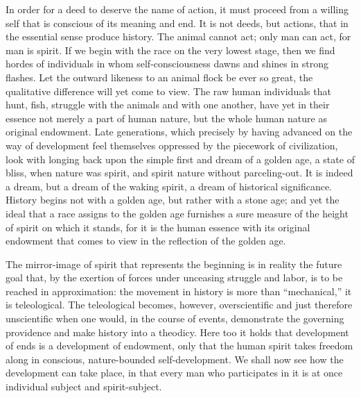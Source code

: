 \documentclass[12pt]{book}
\begin{document}
In order for a deed to deserve the name of action, it must proceed from a willing self that is
conscious of its meaning and end. It is not deeds, but actions, that in the essential sense
produce history. The animal cannot act; only man can act, for man is spirit. If we begin with
the race on the very lowest stage, then we find hordes of individuals in whom self-consciousness
dawns and shines in strong flashes. Let the outward likeness to an animal flock be ever so
great, the qualitative difference will yet come to view. The raw human individuals that hunt,
fish, struggle with the animals and with one another, have yet in their essence not merely a
part of human nature, but the whole human nature as original endowment. Late generations,
which precisely by having advanced on the way of development feel themselves oppressed by the
piecework of civilization, look with longing back upon the simple first and dream of a golden
age, a state of bliss, when nature was spirit, and spirit nature without parceling-out. It is
indeed a dream, but a dream of the waking spirit, a dream of historical significance. History
begins not with a golden age, but rather with a stone age; and yet the ideal that a race
assigns to the golden age furnishes a sure measure of the height of spirit on which it stands,
for it is the human essence with its original endowment that comes to view in the reflection of
the golden age.

The mirror-image of spirit that represents the beginning is in reality the future goal that, by
the exertion of forces under unceasing struggle and labor, is to be reached in approximation:
the movement in history is more than ``mechanical,'' it is teleological. The teleological
becomes, however, overscientific and just therefore unscientific when one would, in the course
of events, demonstrate the governing providence and make history into a theodicy. Here too it
holds that development of ends is a development of endowment, only that the human spirit takes
freedom along in conscious, nature-bounded self-development. We shall now see how the
development can take place, in that every man who participates in it is at once individual
subject and spirit-subject.
\end{document}
